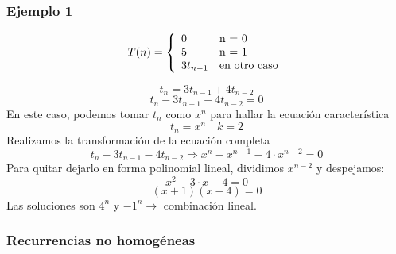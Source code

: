 \documentclass[10pt,a4paper,spanish]{report}
\theoremstyle{definition}
\theoremstyle{remark}
\begin{document}
\subsubsection{\textcolor[rgb]{0.1,0.2,1}Ejemplo 1}
\begin{displaymath}
T(n) = \left\{ \begin{array}{lll}
0 & $n = 0$ \\
5 & $n = 1$ \\
3t_{n-1} & \text{en otro caso}
\end{array} \right.
\end{displaymath}
\begin{center}
\begin{displaymath}
    t_n = 3t_{n-1} + 4t_{n-2}
\end{displaymath}
\begin{displaymath}
    t_n - 3t_{n-1} - 4t_{n-2} = 0
\end{displaymath}
En este caso, podemos tomar $t_n$ como $x^n$ para hallar la ecuación característica
\begin{displaymath}
    t_n = x^n \quad k = 2
\end{displaymath}
Realizamos la transformación de la ecuación completa
\begin{displaymath}
    t_n - 3t_{n-1} - 4t_{n-2} \Rightarrow x^n - x^{n-1} - 4 \cdot x^{n-2} = 0
\end{displaymath}
Para quitar dejarlo en forma polinomial lineal, dividimos $x^{n-2}$ y despejamos:
\begin{displaymath}
    x^2 - 3\cdot x - 4 = 0
\end{displaymath}
\begin{displaymath}
    (x+1)(x-4) = 0
\end{displaymath}
Las soluciones son $4^n$ y $-1^n \rightarrow$ combinación lineal.
\end{center}
\subsubsection{\textcolor[rgb]{0.1,0.2,1}Recurrencias no homogéneas}
\end{document}

